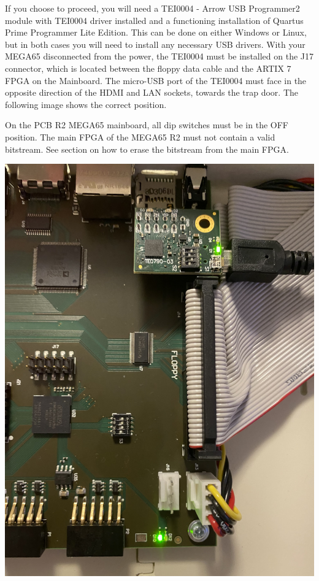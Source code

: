 If you choose to proceed, you will need a TEI0004 - Arrow USB Programmer2 module with TEI0004 driver installed
and a functioning installation of Quartus Prime Programmer Lite Edition.  This can be done on either Windows
or Linux, but in both cases you will need to install any necessary USB drivers.
With your MEGA65 disconnected from the power, the TEI0004 must be installed on the J17 connector,
which is located between the floppy data cable and the ARTIX 7 FPGA on the Mainboard.
The micro-USB port of the TEI0004 must face in the opposite direction of the HDMI and LAN sockets, towards
the trap door.
The following image shows the correct position.

On the PCB R2 MEGA65 mainboard, all dip switches must be in the OFF position. The main FPGA of the MEGA65 R2 must not contain
a valid bitstream. See section  on how to erase the bitstream
from the main FPGA.

\includegraphics[width=\linewidth]{images/jtag_detail_05.jpg}

